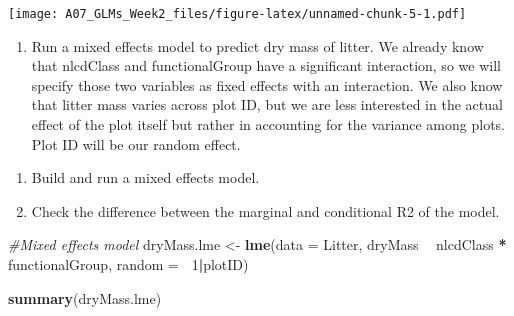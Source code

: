 \documentclass[]{article}
\newenvironment{Shaded}{\begin{snugshade}}{\end{snugshade}}
\newcommand{\CommentTok}[1]{\textcolor[rgb]{0.56,0.35,0.01}{\textit{#1}}}
\newcommand{\DataTypeTok}[1]{\textcolor[rgb]{0.13,0.29,0.53}{#1}}
\newcommand{\DecValTok}[1]{\textcolor[rgb]{0.00,0.00,0.81}{#1}}
\newcommand{\KeywordTok}[1]{\textcolor[rgb]{0.13,0.29,0.53}{\textbf{#1}}}
\newcommand{\NormalTok}[1]{#1}
\newcommand{\OperatorTok}[1]{\textcolor[rgb]{0.81,0.36,0.00}{\textbf{#1}}}
\newcommand{\StringTok}[1]{\textcolor[rgb]{0.31,0.60,0.02}{#1}}
\providecommand{\tightlist}{%
  \setlength{\itemsep}{0pt}\setlength{\parskip}{0pt}}
\begin{document}
\texttt{[image: A07\_GLMs\_Week2\_files/figure-latex/unnamed-chunk-5-1.pdf]}

\begin{enumerate}
\def\labelenumi{\arabic{enumi}.}
\setcounter{enumi}{8}
\tightlist
\item
  Run a mixed effects model to predict dry mass of litter. We already
  know that nlcdClass and functionalGroup have a significant
  interaction, so we will specify those two variables as fixed effects
  with an interaction. We also know that litter mass varies across plot
  ID, but we are less interested in the actual effect of the plot itself
  but rather in accounting for the variance among plots. Plot ID will be
  our random effect.
\end{enumerate}

\begin{enumerate}
\def\labelenumi{\alph{enumi}.}
\tightlist
\item
  Build and run a mixed effects model.
\item
  Check the difference between the marginal and conditional R2 of the
  model.
\end{enumerate}

\begin{Shaded}
\begin{Highlighting}[]
\CommentTok{#Mixed effects model}
\NormalTok{dryMass.lme <-}\StringTok{ }\KeywordTok{lme}\NormalTok{(}\DataTypeTok{data =}\NormalTok{ Litter, }
\NormalTok{              dryMass }\OperatorTok{~}\StringTok{ }\NormalTok{nlcdClass }\OperatorTok{*}\StringTok{ }\NormalTok{functionalGroup, }
              \DataTypeTok{random =} \OperatorTok{~}\DecValTok{1}\OperatorTok{|}\NormalTok{plotID)}

\KeywordTok{summary}\NormalTok{(dryMass.lme)}
\end{Highlighting}
\end{Shaded}
\end{document}
